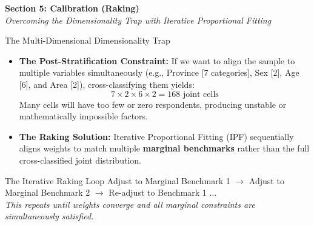 \documentclass[10pt, aspectratio=169]{beamer}
\begin{document}
{
\begin{frame}[plain, c]
  \centering
  \color{white}
  \Huge \textbf{Section 5: Calibration (Raking)} \\
  \vspace{0.4cm}
  \Large \textit{Overcoming the Dimensionality Trap with Iterative Proportional Fitting}
\end{frame}
}

\begin{frame}{The Multi-Dimensional Dimensionality Trap}
  \begin{itemize}
    \item \textbf{The Post-Stratification Constraint:} If we want to align the sample to multiple variables simultaneously (e.g., Province [7 categories], Sex [2], Age [6], and Area [2]), cross-classifying them yields:
    $$7 \times 2 \times 6 \times 2 = 168 \text{ joint cells}$$
    Many cells will have too few or zero respondents, producing unstable or mathematically impossible factors.
    \item \textbf{The Raking Solution:} Iterative Proportional Fitting (IPF) sequentially aligns weights to match multiple \textbf{marginal benchmarks} rather than the full cross-classified joint distribution.
  \end{itemize}

  \begin{block}{The Iterative Raking Loop}
    \centering
    Adjust to Marginal Benchmark 1 $\rightarrow$ Adjust to Marginal Benchmark 2 $\rightarrow$ Re-adjust to Benchmark 1 $\dots$ \\
    \textit{This repeats until weights converge and all marginal constraints are simultaneously satisfied.}
  \end{block}
\end{frame}
\end{document}
